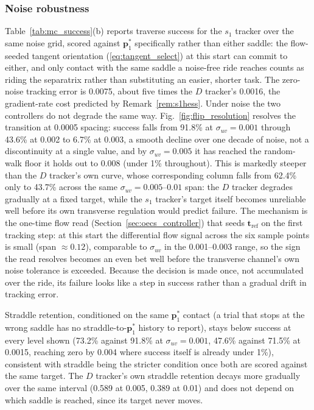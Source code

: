 \documentclass[lettersize,journal]{IEEEtran}
\begin{document}
\subsubsection{Noise robustness}
Table~\ref{tab:mc_success}(b) reports traverse success for the $s_1$
tracker over the same noise grid, scored against $\mathbf{p}^*_1$
specifically rather than either saddle: the flow-seeded tangent
orientation (\ref{eq:tangent_select}) at this start can commit to
either, and only contact with the same saddle a noise-free ride
reaches counts as riding the separatrix rather than substituting an
easier, shorter task. The zero-noise tracking error is 0.0075, about
five times the $D$ tracker's 0.0016, the gradient-rate cost predicted
by Remark~\ref{rem:s1hess}. Under noise the two controllers do not
degrade the same way. Fig.~\ref{fig:flip_resolution} resolves the
transition at 0.0005 spacing: success falls from 91.8\% at
$\sigma_{uv} = 0.001$ through 43.6\% at 0.002 to 6.7\% at 0.003, a
smooth decline over one decade of noise, not a discontinuity at a
single value, and by $\sigma_{uv} = 0.005$ it has reached the
random-walk floor it holds out to 0.008 (under 1\% throughout). This is
markedly steeper than the $D$ tracker's own curve, whose corresponding
column falls from 62.4\% only to 43.7\% across the same
$\sigma_{uv} = 0.005$--$0.01$ span: the $D$ tracker degrades gradually
at a fixed target, while the $s_1$ tracker's target itself becomes
unreliable well before its own transverse regulation would predict
failure. The mechanism is the one-time flow read
(Section~\ref{sec:oecs_controller}) that seeds $\mathbf{t}_{\text{ref}}$
on the first tracking step: at this start the differential flow signal
across the six sample points is small (span $\approx 0.12$), comparable
to $\sigma_{uv}$ in the 0.001--0.003 range, so the sign the read
resolves becomes an even bet well before the transverse channel's own
noise tolerance is exceeded. Because the decision is made once, not
accumulated over the ride, its failure looks like a step in success
rather than a gradual drift in tracking error.

Straddle retention, conditioned on the same $\mathbf{p}^*_1$ contact
(a trial that stops at the wrong saddle has no straddle-to-$\mathbf{p}^*_1$
history to report), stays below success at every level shown
(73.2\% against 91.8\% at $\sigma_{uv} = 0.001$, 47.6\% against 71.5\%
at 0.0015, reaching zero by 0.004 where success itself is already under
1\%), consistent with straddle being the stricter condition once both
are scored against the same target. The $D$ tracker's own straddle
retention decays more gradually over the same interval (0.589 at 0.005,
0.389 at 0.01) and does not depend on which saddle is reached, since its
target never moves.
\end{document}
